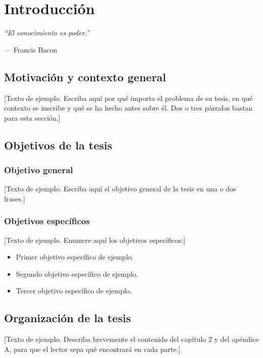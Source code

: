 \chapter{Introducción}\label{Chap1}

\epigraph{ \emph{``El conocimiento es poder.''}}{--- \textup{Francis Bacon}}

\section{Motivación y contexto general}

[Texto de ejemplo. Escriba aquí por qué importa el problema de su tesis,
en qué contexto se inscribe y qué se ha hecho antes sobre él. Dos o tres
párrafos bastan para esta sección.]

\section{Objetivos de la tesis}

\subsection{Objetivo general}

[Texto de ejemplo. Escriba aquí el objetivo general de la tesis en una o
dos frases.]

\subsection{Objetivos específicos}

[Texto de ejemplo. Enumere aquí los objetivos específicos:]
\begin{itemize}
\item Primer objetivo específico de ejemplo.
\item Segundo objetivo específico de ejemplo.
\item Tercer objetivo específico de ejemplo.
\end{itemize}

\section{Organización de la tesis}

[Texto de ejemplo. Describa brevemente el contenido del capítulo 2 y del
apéndice A, para que el lector sepa qué encontrará en cada parte.]
